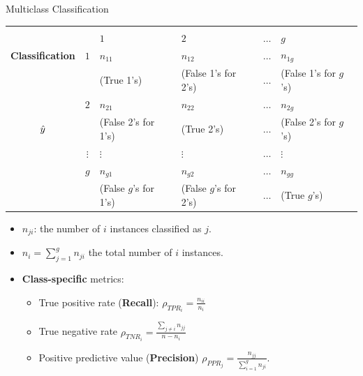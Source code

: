 \documentclass[11pt,compress,t,notes=noshow, xcolor=table]{beamer}
\begin{document}
\begin{vbframe}{Multiclass Classification}
	\small{
		\begin{center}
			\tiny
			\begin{tabular}{cc|>{\centering\arraybackslash}p{8em}>{\centering\arraybackslash}p{8em}>{\centering\arraybackslash}p{5em}>{\centering\arraybackslash}p{8em}}
				& & \multicolumn{4}{c}{\bfseries True Class $y$} \\
				& & $1$ & $2$ & $\ldots$ & $g$  \\
				\hline
				\bfseries Classification     & $1$ & $n_{11}$  &  $n_{12}$  & $\ldots$ &  $n_{1g}$ \\
				& & (True 1's) & (False 1's for 2's) & $\ldots$ &  (False 1's for $g$'s)  \\
				& $2$ &  $n_{21}$  &  $n_{22}$  & $\ldots$ & $n_{2g}$  \\
				$\hat{y}$ & & (False 2's for 1's) & (True 2's) & $\ldots$ &  (False 2's for $g$'s)  \\
				& $\vdots$ & $\vdots$ & $\vdots$ & $\ldots$ & $\vdots$ \\
				& $g$ & $n_{g1}$ & $n_{g2}$  & $\ldots$ &  $n_{gg}$\\
				& & (False $g$'s for 1's) & (False $g$'s for 2's) & $\ldots$ &  (True $g$'s)  \\
			\end{tabular}
		\end{center}
		
		\begin{itemize}
			\item $n_{ji}$: the number of $i$ instances classified as $j$.

            \item $n_i = \sum_{j=1}^g n_{ji}$ the total number of $i$ instances.

            \item \textbf{Class-specific} metrics:
                \begin{itemize}
                    \small
                    
                    \item True positive rate (\textbf{Recall}): $\rho_{TPR_i} = \frac{n_{ii}}{n_i}$
    
                    \item True negative rate $\rho_{TNR_i} = \frac{\sum_{j\neq i}n_{jj}}{n-n_i}$ 
    
                    \item Positive predictive value (\textbf{Precision}) $\rho_{PPR_j} = \frac{n_{jj}}{\sum_{i=1}^g n_{ji}}$.
                    
                \end{itemize}

		\end{itemize}
	}
\end{vbframe}
\end{document}
